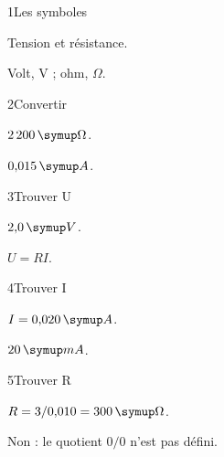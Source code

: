 \par\noindent\begin{minipage}{\linewidth}
\begin{corrige}{1}{Les symboles}
\begin{questions}
\item Tension et résistance.
\item Volt, V ; ohm, $\Omega$.
\end{questions}
\end{corrige}
\end{minipage}
\par\noindent\begin{minipage}{\linewidth}
\begin{corrige}{2}{Convertir}
\begin{questions}
\item $2\,200\unite\Omega$.
\item $0{,}015\unite A$.
\end{questions}
\end{corrige}
\end{minipage}
\par\noindent\begin{minipage}{\linewidth}
\begin{corrige}{3}{Trouver U}
\begin{questions}
\item $2{,}0\unite V$.
\item $U=RI$.
\end{questions}
\end{corrige}
\end{minipage}
\par\noindent\begin{minipage}{\linewidth}
\begin{corrige}{4}{Trouver I}
\begin{questions}
\item $I=0{,}020\unite A$.
\item $20\unite{mA}$.
\end{questions}
\end{corrige}
\end{minipage}
\par\noindent\begin{minipage}{\linewidth}
\begin{corrige}{5}{Trouver R}
\begin{questions}
\item $R=3/0{,}010=300\unite\Omega$.
\item Non : le quotient $0/0$ n’est pas défini.
\end{questions}
\end{corrige}
\end{minipage}
